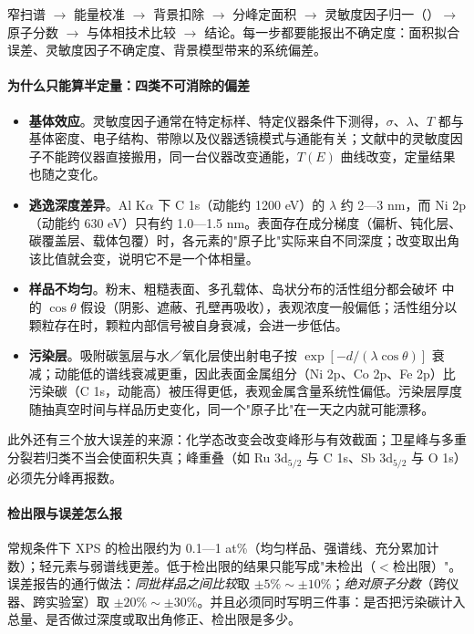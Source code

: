 \begin{dataflow}
窄扫谱 $\to$ 能量校准 $\to$ 背景扣除 $\to$ 分峰定面积 $\to$ 灵敏度因子归一（）$\to$ 原子分数 $\to$ 与体相技术比较 $\to$ 结论。每一步都要能报出不确定度：面积拟合误差、灵敏度因子不确定度、背景模型带来的系统偏差。
\end{dataflow}

\paragraph{为什么只能算半定量：四类不可消除的偏差}
\begin{itemize}
\item \textbf{基体效应}。灵敏度因子通常在特定标样、特定仪器条件下测得，$\sigma$、$\lambda$、$T$ 都与基体密度、电子结构、带隙以及仪器透镜模式与通能有关；文献中的灵敏度因子不能跨仪器直接搬用，同一台仪器改变通能，$T(E)$ 曲线改变，定量结果也随之变化。
\item \textbf{逃逸深度差异}。Al K$\alpha$ 下 C 1s（动能约 1200 eV）的 $\lambda$ 约 2—3 nm，而 Ni 2p（动能约 630 eV）只有约 1.0—1.5 nm。表面存在成分梯度（偏析、钝化层、碳覆盖层、载体包覆）时，各元素的"原子比"实际来自不同深度；改变取出角该比值就会变，说明它不是一个体相量。
\item \textbf{样品不均匀}。粉末、粗糙表面、多孔载体、岛状分布的活性组分都会破坏 中的 $\cos\theta$ 假设（阴影、遮蔽、孔壁再吸收），表观浓度一般偏低；活性组分以颗粒存在时，颗粒内部信号被自身衰减，会进一步低估。
\item \textbf{污染层}。吸附碳氢层与水／氧化层使出射电子按 $\exp[-d/(\lambda\cos\theta)]$ 衰减；动能低的谱线衰减更重，因此表面金属组分（Ni 2p、Co 2p、Fe 2p）比污染碳（C 1s，动能高）被压得更低，表观金属含量系统性偏低。污染层厚度随抽真空时间与样品历史变化，同一个"原子比"在一天之内就可能漂移。
\end{itemize}
此外还有三个放大误差的来源：化学态改变会改变峰形与有效截面；卫星峰与多重分裂若归类不当会使面积失真；峰重叠（如 Ru 3d$_{5/2}$ 与 C 1s、Sb 3d$_{5/2}$ 与 O 1s）必须先分峰再报数。

\paragraph{检出限与误差怎么报}
常规条件下 XPS 的检出限约为 0.1—1 at\%（均匀样品、强谱线、充分累加计数）；轻元素与弱谱线更差。低于检出限的结果只能写成"未检出（$<$检出限）"。误差报告的通行做法：\emph{同批样品之间比较}取 $\pm5\%\sim\pm10\%$；\emph{绝对原子分数}（跨仪器、跨实验室）取 $\pm20\%\sim\pm30\%$。并且必须同时写明三件事：是否把污染碳计入总量、是否做过深度或取出角修正、检出限是多少。

